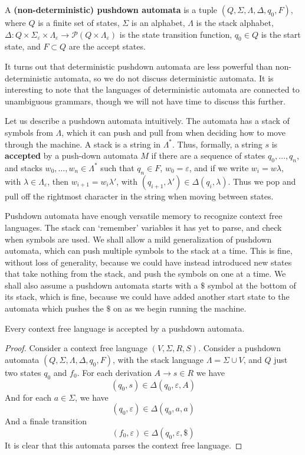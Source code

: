 \begin{definition}
    A {\bf (non-deterministic) pushdown automata} is a tuple $(Q, \Sigma, \Lambda, \Delta, q_0, F)$, where $Q$ is a finite set of states, $\Sigma$ is an alphabet, $\Lambda$ is the stack alphabet, $\Delta: Q \times \Sigma_\varepsilon \times \Lambda_\varepsilon \to \mathcal{P}(Q \times \Lambda_\varepsilon)$ is the state transition function, $q_0 \in Q$ is the start state, and $F \subset Q$ are the accept states.
\end{definition}

It turns out that deterministic pushdown automata are less powerful than non-deterministic automata, so we do not discuss deterministic automata. It is interesting to note that the languages of deterministic automata are connected to unambiguous grammars, though we will not have time to discuss this further.

Let us describe a pushdown automata intuitively. The automata has a stack of symbols from $\Lambda$, which it can push and pull from when deciding how to move through the machine. A stack is a string in $\Lambda^*$. Thus, formally, a string $s$ is {\bf accepted} by a push-down automata $M$ if there are a sequence of states $q_0, \dots, q_n$, and stacks $w_0, \dots, w_n \in \Lambda^*$ such that $q_n \in F$, $w_0 = \varepsilon$, and if we write $w_i = w \lambda$, with $\lambda \in \Lambda_\varepsilon$, then $w_{i+1} = w_i \lambda'$, with $(q_{i+1}, \lambda') \in \Delta(q_i,\lambda)$. Thus we pop and pull off the rightmost character in the string when moving between states.

Pushdown automata have enough versatile memory to recognize context free languages. The stack can `remember' variables it has yet to parse, and check when symbols are used. We shall allow a mild generalization of pushdown automata, which can push multiple symbols to the stack at a time. This is fine, without loss of generality, because we could have instead introduced new states that take nothing from the stack, and push the symbols on one at a time. We shall also assume a pushdown automata starts with a $\$$ symbol at the bottom of its stack, which is fine, because we could have added another start state to the automata which pushes the $\$$ on as we begin running the machine.

\begin{theorem}
    Every context free language is accepted by a pushdown automata.
\end{theorem}
\begin{proof}
    Consider a context free language $(V, \Sigma, R, S)$. Consider a pushdown automata $(Q,\Sigma, \Lambda,\Delta,q_0,F)$, with the stack language $\Lambda = \Sigma \cup V$, and $Q$ just two states $q_0$ and $f_0$. For each derivation $A \rightarrow s \in R$ we have
    \[ (q_0, s) \in \Delta(q_0, \varepsilon, A) \]
    And for each $a \in \Sigma$, we have
    \[ (q_0, \varepsilon) \in \Delta(q_0, a, a) \]
    And a finale transition
    \[ (f_0, \varepsilon) \in \Delta(q_0, \varepsilon, \$) \]
    It is clear that this automata parses the context free language.
\end{proof}


